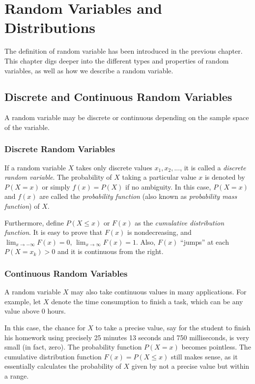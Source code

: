 \chapter{Random Variables and Distributions} \label{ch:rv}

The definition of random variable has been introduced in the previous chapter. This chapter digs deeper into the different types and properties of random variables, as well as how we describe a random variable.

\section{Discrete and Continuous Random Variables}

A random variable may be discrete or continuous depending on the sample space of the variable.

\subsection{Discrete Random Variables}

If a random variable $X$ takes only discrete values $x_1, x_2, ...$, it is called a \textit{discrete random variable}.
The probability of $X$ taking a particular value $x$ is denoted by $P(X=x)$ or simply $f(x)=P(X)$ if no ambiguity. In this case, $P(X=x)$ and $f(x)$ are called the \textit{probability function} (also known as \textit{probability mass function}) of $X$.

Furthermore, define $P(X\leq x)$ or $F(x)$ as the \textit{cumulative distribution function}. It is easy to prove that $F(x)$ is nondecreasing, and $\lim_{x\rightarrow -\infty}F(x)=0$, $\lim_{x\rightarrow \infty}F(x)=1$. Also, $F(x)$ ``jumps'' at each $P(X=x_k)>0$ and it is continuous from the right.

\subsection{Continuous Random Variables}

A random variable $X$ may also take continuous values in many applications. For example, let $X$ denote the time consumption to finish a task, which can be any value above $0$ hours.

In this case, the chance for $X$ to take a precise value, say for the student to finish his homework using precisely 25 minutes 13 seconds and 750 milliseconds, is very small (in fact, zero). The probability function $P(X=x)$ becomes pointless. The cumulative distribution function $F(x) = P(X\leq x)$ still makes sense, as it essentially calculates the probability of $X$ given by not a precise value but within a range.

